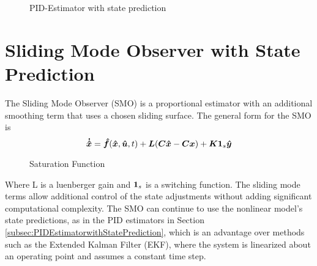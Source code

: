 \begin{figure}[H]
  \centerline{}
  \caption{PID-Estimator with state prediction}
  \label{fig:PIDEstimatorwithstateprediction}
\end{figure}

\section{Sliding Mode Observer with State Prediction}
\label{sec:SlidingModeObserverwithStatePrediction}

The Sliding Mode Observer (SMO) is a proportional estimator with an additional smoothing term that uses a chosen sliding surface.  The general form for the SMO is
\begin{equation}
  \boldsymbol{\dot{\hat{x}}} = \boldsymbol{\hat{f}}(\boldsymbol{\hat{x}}, \boldsymbol{\hat{u}}, t) + \boldsymbol{L}(\boldsymbol{C}\boldsymbol{\hat{x}} - \boldsymbol{C}\boldsymbol{x}) + \boldsymbol{K}\boldsymbol{1}_s\boldsymbol{\hat{y}}
  \label{eqn:SMOContinuous}
\end{equation}

\begin{figure}[ht]
  \centerline{}
  \caption{Saturation Function}
  \label{fig:SaturationFunction}
\end{figure}

Where L is a luenberger gain and $\boldsymbol{1}_s$ is a switching function.  The sliding mode terms allow additional control of the state adjustments without adding significant computational complexity.  The SMO can continue to use the nonlinear model's state predictions, as in the PID estimators in Section \ref{subsec:PIDEstimatorwithStatePrediction}, which is an advantage over methods such as the Extended Kalman Filter (EKF), where the system is linearized about an operating point and assumes a constant time step.

